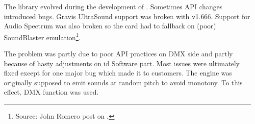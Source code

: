 The library evolved during the development of \doom. Sometimes API changes introduced bugs. Gravis UltraSound support was broken with v1.666. Support for Audio Spectrum was also broken so the card had to fallback on (poor) SoundBlaster emulation\footnote{Source: John Romero post on .}.\\
\par
The problem was partly due to poor API practices on DMX side and partly because of hasty adjustments on id Software part. Most issues were ultimately fixed except for one major bug which made it to customers. The engine was originally supposed to emit sounds at random pitch to avoid monotony. To this effect, DMX function  was used.\\
\par
{}





